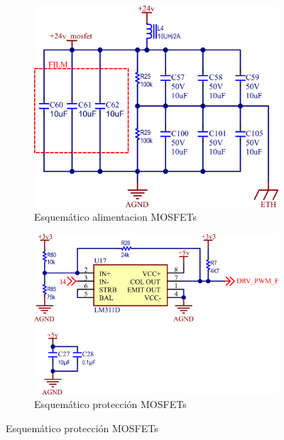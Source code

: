 \documentclass[../et.tex]{subfiles}
\begin{document}
\begin{figure}[!htbp]
  \begin{subfigure}[b]{0.4\textwidth}
    \centering
    \includegraphics[width=\textwidth]{../images/mosfet-alimentacion.png}
    \caption{Esquemático alimentacion MOSFETs}
    \label{fig:mosfet-alimentacion}
    \vspace*{10mm}
  \end{subfigure}
  \hfill
  \begin{subfigure}[b]{0.5\textwidth}
    \centering
    \includegraphics[width=\textwidth]{../images/mosfet-proteccion.png}
    \caption{Esquemático protección MOSFETs}
    \label{fig:mosfet-proteccion}
    \vspace*{10mm}
  \end{subfigure}


\end{figure}
\end{document}
